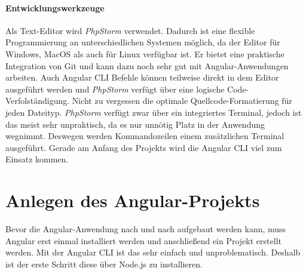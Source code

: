 \paragraph{Entwicklungswerkzeuge} Als Text-Editor wird \textit{PhpStorm} verwendet. Dadurch ist eine flexible Programmierung an unterschiedlichen Systemen möglich, da der Editor für Windows, MacOS als auch für Linux verfügbar ist. Er bietet eine praktische Integration von Git und kann dazu noch sehr gut mit Angular-Anwendungen arbeiten. Auch Angular CLI Befehle können teilweise direkt in dem Editor ausgeführt werden und \textit{PhpStorm} verfügt über eine logische Code-Verfolständigung. Nicht zu vergessen die optimale Quellcode-Formatierung für jeden Dateityp. \textit{PhpStorm} verfügt zwar über ein integriertes Terminal, jedoch ist das meist sehr unpraktisch, da es nur unnötig Platz in der Anwendung wegnimmt. Deswegen werden Kommandozeilen einem zusätzlichen Terminal ausgeführt. Gerade am Anfang des Projekts wird die Angular CLI viel zum Einsatz kommen.
%
\section{Anlegen des Angular-Projekts}
\label{sec:umsetzung}
%
Bevor die Angular-Anwendung nach und nach aufgebaut werden kann, muss Angular erst einmal installiert werden und anschließend ein Projekt erstellt werden. Mit der Angular CLI ist das sehr einfach und unproblematisch. Deshalb ist der erste Schritt diese über Node.js zu installieren.
%

